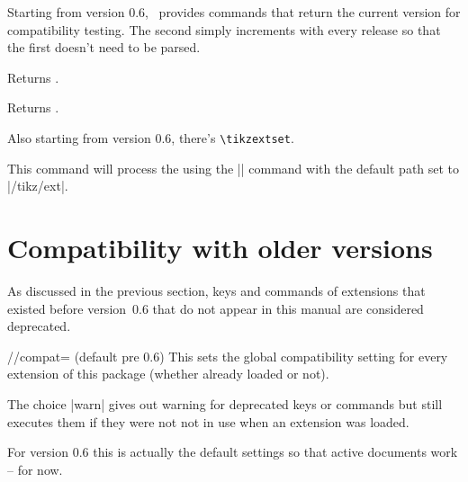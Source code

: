 \begin{multicols}{2}
Starting from version 0.6,
\tikzextname\ provides commands that return the current version for compatibility testing.
The second simply increments with every release
so that the first doesn't need to be parsed.
\begin{command}{\tikzextversion}
  Returns \texttt{\tikzextversion}.
\end{command}
\begin{command}{\tikzextversionnumber}
  Returns \texttt{\tikzextversionnumber}.
\end{command}
%
Also starting from version 0.6, there's \texttt{\textbackslash tikzextset}.
\begin{command}{\tikzextset{}}
  This command will process the  using the
  |\pgfkeys| command with the default path set to |/tikz/ext|.
\end{command}

\newcolumn
\section{Compatibility with older versions}
As discussed in the previous section,
keys and commands of extensions that existed before version~0.6
that do not appear in this manual are considered deprecated.

\begin{key}{/\tikzext/compat= (default pre 0.6)}
  This sets the global compatibility setting for every extension of this package
  (whether already loaded or not).

  The choice |warn| gives out warning for deprecated keys or commands
  but still executes them if they were not not in use when an extension was loaded.
  
  For version 0.6 this is actually the default settings so that active documents work
  -- for now.
  

\end{key}
\end{multicols}
